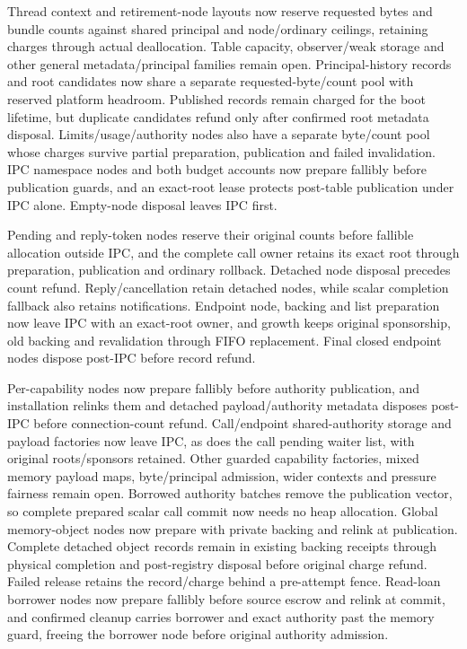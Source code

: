 \begin{itemize}
        Thread context and retirement-node layouts now reserve requested bytes
        and bundle counts against shared principal and node/ordinary ceilings,
        retaining charges through actual deallocation. Table capacity,
        observer/weak storage and other general metadata/principal families
        remain open. Principal-history records and root candidates now share a
        separate requested-byte/count pool with reserved platform headroom.
        Published records remain charged for the boot lifetime, but duplicate
        candidates refund only after confirmed root metadata disposal.
        Limits/usage/authority nodes also have a separate byte/count pool whose
        charges survive partial preparation, publication and failed invalidation.
        IPC namespace nodes and both budget accounts now prepare fallibly
        before publication guards, and an exact-root lease protects post-table
        publication under IPC alone. Empty-node disposal leaves IPC first.
        
        Pending and reply-token nodes reserve their original counts before fallible
        allocation outside IPC, and the complete call owner retains its exact root
        through preparation, publication and ordinary rollback. Detached node
        disposal precedes count refund. Reply/cancellation retain detached nodes, while
        scalar completion fallback also retains notifications. Endpoint node, backing
        and list preparation now leave IPC with an exact-root owner, and growth keeps
        original sponsorship, old backing and revalidation through FIFO replacement.
        Final closed endpoint nodes dispose post-IPC before record refund.
        
        Per-capability nodes now prepare fallibly before authority publication, and
        installation relinks them and detached payload/authority metadata disposes
        post-IPC before connection-count refund. Call/endpoint shared-authority
        storage and payload factories now leave IPC, as does the call pending
        waiter list, with original roots/sponsors retained. Other guarded
        capability factories, mixed memory payload maps, byte/principal admission,
        wider contexts and pressure fairness remain open. Borrowed authority batches
        remove the publication vector, so complete prepared scalar call commit now
        needs no heap allocation. Global memory-object nodes now prepare with
        private backing and relink at publication. Complete detached object
        records remain in existing backing receipts through physical completion
        and post-registry disposal before original charge refund. Failed release
        retains the record/charge behind a pre-attempt fence. Read-loan borrower
        nodes now prepare fallibly before source escrow and relink at commit, and
        confirmed cleanup carries borrower and exact authority past the memory
        guard, freeing the borrower node before original authority admission.
        

\end{itemize}
